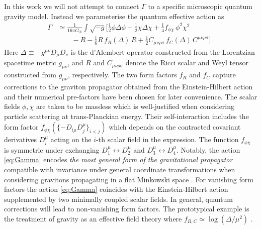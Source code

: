 \documentclass[aps,prl,onecolumn,superscriptaddress,longbibliography,nofootinbib,floatfix,showpacs,12pt]{revtex4-1}
\begin{document}
In this work we will not attempt to connect $\Gamma$ to a specific microscopic quantum gravity model.
Instead we parameterise the quantum effective action as
%
\begin{equation}\label{eq:Gamma}
\begin{aligned}
 \Gamma &\simeq \frac{1}{16\pi G_N} \int \sqrt{-g} \bigg[ \frac{1}{2} \phi \Delta \phi + \frac{1}{2} \chi \Delta \chi	+ \frac{1}{4} f_{\phi\chi} \, \phi^2 \chi^2 \\
 & \qquad - R - \frac{1}{6} R \, f_R(\Delta) \, R + \frac{1}{2} C_{\mu\nu\rho\sigma} \, f_{C}(\Delta) \, C^{\mu\nu\rho\sigma} \bigg] \, .
\end{aligned}
\end{equation}
%
Here  $\Delta \equiv - g^{\mu\nu} D_\mu D_\nu$ is the d'Alembert operator constructed from the Lorentzian spacetime metric $g_{\mu\nu}$, and $R$ and $C_{\mu\nu\rho\sigma}$ denote the Ricci scalar and Weyl tensor constructed from $g_{\mu\nu}$, respectively.
The two form factors $f_{R}$ and $f_{C}$ capture corrections to the graviton propagator obtained from the Einstein-Hilbert action and their numerical pre-factors have been chosen for later convenience.
The scalar fields $\phi,\chi$ are taken to be massless which is well-justified when considering particle scattering at trans-Planckian energy.
Their self-interaction includes the form factor $f_{\phi\chi}(\{-D_{i\mu} D_j^\mu \}_{i<j})$ which depends on the contracted covariant derivatives $D_i^\mu$ acting on the $i$-th scalar field in the expression.
The function $f_{\phi\chi}$ is symmetric under exchanging $D_1^\mu \leftrightarrow D_2^\mu$ and $D_3^\mu \leftrightarrow D_4^\mu$.
Notably, the action \eqref{eq:Gamma} encodes \emph{the most general form of the gravitational propagator} compatible with invariance under general coordinate transformations when considering gravitons propagating in a flat Minkowski space \cite{Barvinsky:1990up}.
For vanishing form factors the action \eqref{eq:Gamma} coincides with the Einstein-Hilbert action supplemented by two minimally coupled scalar fields.
In general, quantum corrections will lead to non-vanishing form factors.
The prototypical example is the treatment of gravity as an effective field theory where $f_{R,C} \simeq \log(\Delta/\mu^2)$ \cite{'tHooft:1974bx, Donoghue:1993eb, Donoghue:1994dn}.
\end{document}
